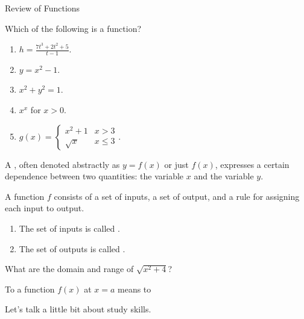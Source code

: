 \documentclass[../main.tex]{subfiles}
\begin{document}
\begin{lesson}{Review of Functions}
  \begin{example}
    Which of the following is  a function?
    \begin{enumerate}[label=(\alph*)]
      \item \(h = \frac{7t^{3} + 2t^{2} + 5}{t - 1}\).
      \item \(y = x^{2} - 1\).
      \item \(x^{2} + y^{2} = 1\).
      \item \(x^{x}\) for \(x > 0\).
      \item \(g(x) = \begin{cases} x^{2} + 1 & x > 3\\ \sqrt{x} & x \le 3 \end{cases}\).
    \end{enumerate}
  \end{example} 


  A , often denoted abstractly as \(y = f(x)\) or just \(f(x)\), expresses a certain dependence between two quantities: the  variable \(x\) and the  variable \(y\).
  \vspace{1em}

  \begin{mdframed}[style=withref]
    A function \(f\) consists of a set of inputs, a set of output, and a rule for assigning each input to \underline{\hspace{2in}} output.
    \begin{enumerate}
      \item The set of inputs is called \underline{\hspace{1in}}.
      \item The set of outputs is called \underline{\hspace{1in}}.
    \end{enumerate}

  \end{mdframed}

  \begin{example}
    What are the domain and range of \(\sqrt{x^{2} + 4}\)?
  \end{example}

  To  a function \(f(x)\) at \(x = a\) means to \underline{\hspace{3in}}

  \clearpage
  Let's talk a little bit about study skills. 


\end{lesson}
\end{document}
